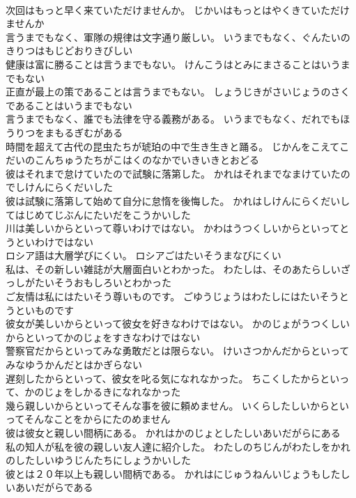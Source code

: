 \documentclass[8pt]{extreport}
\begin{document}
\begin{CJK}{UTF8}{min}
\\	次回はもっと早く来ていただけませんか。	じかいはもっとはやくきていただけませんか 
\\	言うまでもなく、軍隊の規律は文字通り厳しい。	いうまでもなく、ぐんたいのきりつはもじどおりきびしい 
\\	健康は富に勝ることは言うまでもない。	けんこうはとみにまさることはいうまでもない 
\\	正直が最上の策であることは言うまでもない。	しょうじきがさいじょうのさくであることはいうまでもない 
\\	言うまでもなく、誰でも法律を守る義務がある。	いうまでもなく、だれでもほうりつをまもるぎむがある 
\\	時間を超えて古代の昆虫たちが琥珀の中で生き生きと踊る。	じかんをこえてこだいのこんちゅうたちがこはくのなかでいきいきとおどる 
\\	彼はそれまで怠けていたので試験に落第した。	かれはそれまでなまけていたのでしけんにらくだいした 
\\	彼は試験に落第して始めて自分に怠惰を後悔した。	かれはしけんにらくだいしてはじめてじぶんにたいだをこうかいした 
\\	川は美しいからといって尊いわけではない。	かわはうつくしいからといってとうといわけではない 
\\	ロシア語は大層学びにくい。	ロシアごはたいそうまなびにくい 
\\	私は、その新しい雑誌が大層面白いとわかった。	わたしは、そのあたらしいざっしがたいそうおもしろいとわかった 
\\	ご友情は私にはたいそう尊いものです。	ごゆうじょうはわたしにはたいそうとうといものです 
\\	彼女が美しいからといって彼女を好きなわけではない。	かのじょがうつくしいからといってかのじょをすきなわけではない 
\\	警察官だからといってみな勇敢だとは限らない。	けいさつかんだからといってみなゆうかんだとはかぎらない 
\\	遅刻したからといって、彼女を叱る気になれなかった。	ちこくしたからといって、かのじょをしかるきになれなかった 
\\	幾ら親しいからといってそんな事を彼に頼めません。	いくらしたしいからといってそんなことをからにたのめません 
\\	彼は彼女と親しい間柄にある。	かれはかのじょとしたしいあいだがらにある 
\\	私の知人が私を彼の親しい友人達に紹介した。	わたしのちじんがわたしをかれのしたしいゆうじんたちにしょうかいした 
\\	彼とは２０年以上も親しい間柄である。	かれはにじゅうねんいじょうもしたしいあいだがらである 

\end{CJK}
\end{document}
